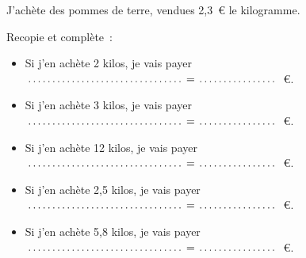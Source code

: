 J'achète des pommes de terre, vendues 2,3~\textgreek{\euro} le kilogramme.
\par Recopie et complète :
\begin{itemize}
\item Si j'en achète 2 kilos, je vais payer $\hbox to5cm{\dotfill}=\hbox to2.5cm{\dotfill}$~\textgreek{\euro}.
\item Si j'en achète 3 kilos, je vais payer $\hbox to5cm{\dotfill}=\hbox to2.5cm{\dotfill}$~\textgreek{\euro}.
\item Si j'en achète 12 kilos, je vais payer $\hbox to5cm{\dotfill}=\hbox to2.5cm{\dotfill}$~\textgreek{\euro}.
\item Si j'en achète 2,5 kilos, je vais payer $\hbox to5cm{\dotfill}=\hbox to2.5cm{\dotfill}$~\textgreek{\euro}.
\item Si j'en achète 5,8 kilos, je vais payer $\hbox to5cm{\dotfill}=\hbox to2.5cm{\dotfill}$~\textgreek{\euro}.
\end{itemize}